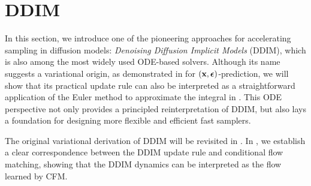 \clearpage
\newpage

\section{\texorpdfstring{DDIM}{DDIM}}\label{sec:revisit-ddim}
In this section, we introduce one of the pioneering approaches for accelerating sampling in diffusion models: \emph{Denoising Diffusion Implicit Models} (DDIM), which is also among the most widely used ODE-based solvers. Although its name suggests a variational origin, as demonstrated in  for $({\mathbf{x}},{\bm{\epsilon}})$-prediction, we will show that its practical update rule can also be interpreted as a straightforward application of the Euler method to approximate the integral in . This ODE perspective not only provides a principled reinterpretation of DDIM, but also lays a foundation for designing more flexible and efficient fast samplers.

The original variational derivation of DDIM will be revisited in . In , we establish a clear correspondence between the DDIM update rule and conditional flow matching, showing that the DDIM dynamics can be interpreted as the flow learned by CFM.






